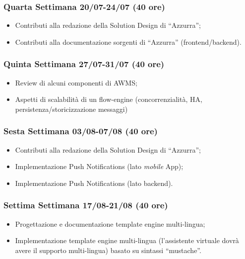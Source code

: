 \begin{trivlist}
\item \subsubsection{Quarta Settimana 20/07-24/07  (40 ore)}
\begin{itemize}
	\item Contributi alla redazione della Solution Design di “Azzurra”;
	\item Contributi alla documentazione sorgenti di “Azzurra” (frontend/backend).
\end{itemize}

\item \subsubsection{Quinta Settimana 27/07-31/07 (40 ore)}
\begin{itemize}
	\item Review di alcuni componenti di \gls{AWMS};
	\item Aspetti di scalabilità di un flow-engine (concorrenzialità, HA, persistenza/storicizzazione
	messaggi)
\end{itemize}

\item \subsubsection{Sesta Settimana 03/08-07/08 (40 ore)}
\begin{itemize}
	\item Contributi alla redazione della Solution Design di “Azzurra”;
	\item Implementazione Push Notifications (lato \emph{mobile} App);
	\item Implementazione Push Notifications (lato backend).
\end{itemize}

\item \subsubsection{Settima Settimana 17/08-21/08 (40 ore)}
\begin{itemize}
	\item Progettazione e documentazione template engine multi-lingua;
	\item Implementazione template engine multi-lingua (l’assistente virtuale dovrà avere il supporto multi-lingua) basato su sintassi “mustache”.
\end{itemize}	


\end{trivlist}
